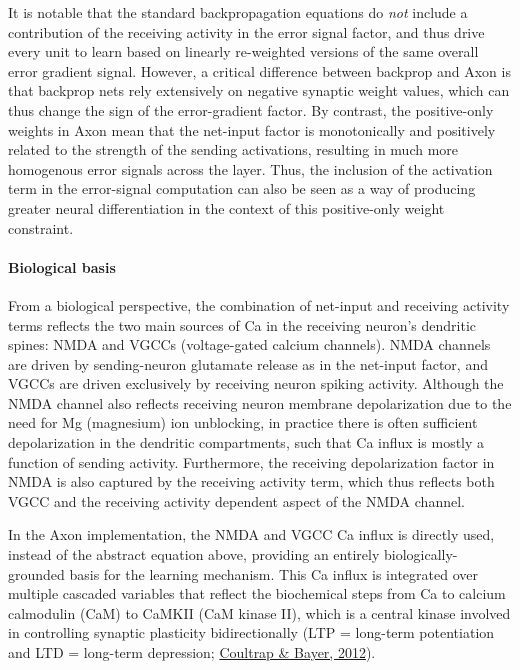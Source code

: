 \documentclass[11pt,twoside]{article}
\newif\myifpdf
\begin{document}
It is notable that the standard backpropagation equations do \emph{not} include a contribution of the receiving activity in the error signal factor, and thus drive every unit to learn based on linearly re-weighted versions of the same overall error gradient signal. However, a critical difference between backprop and Axon is that backprop nets rely extensively on negative synaptic weight values, which can thus change the sign of the error-gradient factor. By contrast, the positive-only weights in Axon mean that the net-input factor is monotonically and positively related to the strength of the sending activations, resulting in much more homogenous error signals across the layer. Thus, the inclusion of the activation term in the error-signal computation can also be seen as a way of producing greater neural differentiation in the context of this positive-only weight constraint.

\paragraph{Biological basis}

From a biological perspective, the combination of net-input and receiving activity terms reflects the two main sources of Ca in the receiving neuron's dendritic spines: NMDA and VGCCs (voltage-gated calcium channels). NMDA channels are driven by sending-neuron glutamate release as in the net-input factor, and VGCCs are driven exclusively by receiving neuron spiking activity. Although the NMDA channel also reflects receiving neuron membrane depolarization due to the need for Mg (magnesium) ion unblocking, in practice there is often sufficient depolarization in the dendritic compartments, such that Ca influx is mostly a function of sending activity. Furthermore, the receiving depolarization factor in NMDA is also captured by the receiving activity term, which thus reflects both VGCC and the receiving activity dependent aspect of the NMDA channel.

In the Axon implementation, the NMDA and VGCC Ca influx is directly used, instead of the abstract equation above, providing an entirely biologically-grounded basis for the learning mechanism. This Ca influx is integrated over multiple cascaded variables that reflect the biochemical steps from Ca to calcium calmodulin (CaM) to CaMKII (CaM kinase II), which is a central kinase involved in controlling synaptic plasticity bidirectionally (LTP = long-term potentiation and LTD = long-term depression; \protect\hyperlink{references}{Coultrap \& Bayer, 2012}).
\end{document}
